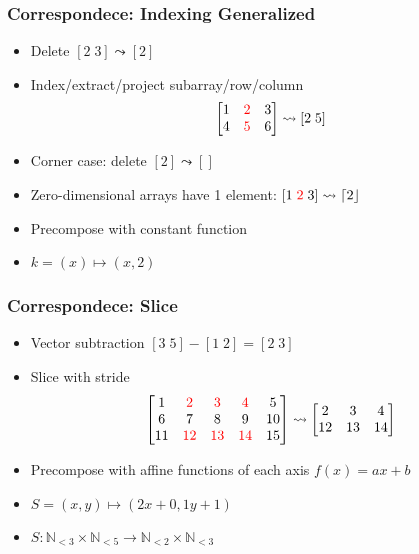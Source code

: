 \documentclass[xetex,mathserif,serif]{beamer}
\newcommand\Nat{\mathbb{N}}
\newcommand\NB[1]{\textcolor{red}{#1}}
\begin{document}
\begin{frame}
  \frametitle{Correspondece: Indexing Generalized}
  \pause
  \begin{itemize}[<+->]
    \item Delete \([2\;3] \leadsto [2]\)
    \item Index/extract/project subarray/row/column
      \[
        \begin{bmatrix}
          1 & \NB 2 & 3 \\ 4 & \NB 5 & 6
        \end{bmatrix} \leadsto
        [2\;5]
      \]
    \item Corner case: delete \([2] \leadsto []\)
    \item Zero-dimensional arrays have 1 element: \([1\;\NB 2\;3] \leadsto \lceil 2\rfloor\)  
    \item Precompose with constant function
    \item \(k = (x)\mapsto (x, 2)\)
  \end{itemize}
\end{frame}

\begin{frame}
  \frametitle{Correspondece: Slice}
  \pause
  \begin{itemize}[<+->]
    \item Vector subtraction \( [3\;5] - [1\;2] = [2\;3] \)
    \item Slice with stride
      \[
        \begin{bmatrix}
          1 & \NB 2 & \NB 3 & \NB 4 & 5 \\
          6 & 7 & 8 &  9 & 10 \\
          11 & \NB{12} & \NB{13} & \NB{14} & 15
        \end{bmatrix} \leadsto \begin{bmatrix}
          2 & 3 & 4 \\
          12 & 13 & 14
        \end{bmatrix}
      \]
    \item Precompose with affine functions of each axis \(f(x) = ax + b\)
    \item \(S = (x, y) \mapsto (2x + 0, 1y + 1)\)
    \item \(S : \Nat_{<3}\times\Nat_{<5} \to \Nat_{<2}\times\Nat_{<3}\)
  \end{itemize}
\end{frame}
\end{document}
